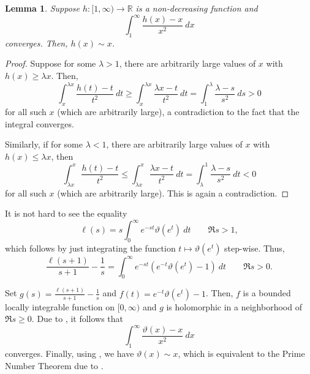 \documentclass[12pt]{article}
\theoremstyle{thmstyle}
\newtheorem{lemma}[theorem]{Lemma}
\theoremstyle{defstyle}
\newcommand{\R}{\mathbb{R}}
\renewcommand{\le}{\leqslant}
\renewcommand{\ge}{\geqslant}
\begin{document}
\begin{lemma}
    Suppose $h: [1,\infty)\to\R$ is a non-decreasing function and 
    \begin{equation*}
        \int_1^\infty\frac{h(x) - x}{x^2}~dx
    \end{equation*}
    converges. Then, $h(x)\sim x$.
\end{lemma}
\begin{proof}
    Suppose for some $\lambda > 1$, there are arbitrarily large values of $x$ with $h(x)\ge\lambda x$. Then, 
    \begin{equation*}
        \int_x^{\lambda x}\frac{h(t) - t}{t^2}~dt\ge \int_x^{\lambda x}\frac{\lambda x - t}{t^2}~dt = \int_1^\lambda\frac{\lambda - s}{s^2}~ds > 0
    \end{equation*}
    for all such $x$ (which are arbitrarily large), a contradiction to the fact that the integral converges.

    Similarly, if for some $\lambda < 1$, there are arbitrarily large values of $x$ with $h(x)\le\lambda x$, then 
    \begin{equation*}
        \int_{\lambda x}^x\frac{h(t) - t}{t^2}\le\int_{\lambda x}^{x}\frac{\lambda x - t}{t^2}~dt = \int_\lambda^1\frac{\lambda - s}{s^2}~dt < 0
    \end{equation*}
    for all such $x$ (which are arbitrarily large). This is again a contradiction.
\end{proof}

It is not hard to see the equality 
\begin{equation*}
    \ell(s) = s\int_0^\infty e^{-st}\vartheta(e^t)~dt\qquad\Re s > 1,
\end{equation*}
which follows by just integrating the function $t\mapsto\vartheta(e^t)$ step-wise. Thus, 
\begin{equation*}
    \frac{\ell(s + 1)}{s + 1} - \frac{1}{s} = \int_0^\infty e^{-st}\left(e^{-t}\vartheta(e^t) - 1\right)~dt\qquad\Re s > 0.
\end{equation*}

Set $g(s) = \frac{\ell(s + 1)}{s + 1} - \frac{1}{s}$ and $f(t) = e^{-t}\vartheta(e^t) - 1$. Then, $f$ is a bounded locally integrable function on $[0, \infty)$ and $g$ is holomorphic in a neighborhood of $\Re s\ge 0$. Due to , it follows that 
\begin{equation*}
    \int_1^\infty\frac{\vartheta(x) - x}{x^2}~dx
\end{equation*}
converges. Finally, using , we have $\vartheta(x)\sim x$, which is equivalent to the Prime Number Theorem due to .
\end{document}
